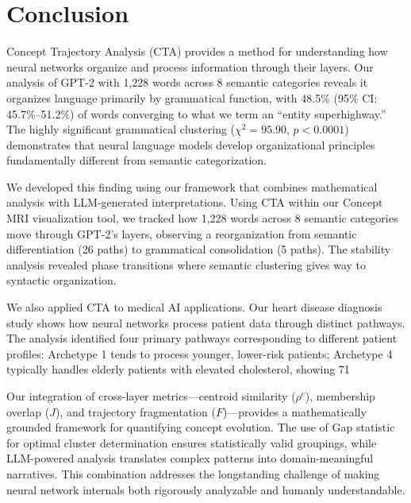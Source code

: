 \section{Conclusion}

Concept Trajectory Analysis (CTA) provides a method for understanding how neural networks organize and process information through their layers. Our analysis of GPT-2 with 1,228 words across 8 semantic categories reveals it organizes language primarily by grammatical function, with 48.5\% (95\% CI: 45.7\%–51.2\%) of words converging to what we term an ``entity superhighway.'' The highly significant grammatical clustering ($\chi^2 = 95.90$, $p < 0.0001$) demonstrates that neural language models develop organizational principles fundamentally different from semantic categorization.

We developed this finding using our framework that combines mathematical analysis with LLM-generated interpretations. Using CTA within our Concept MRI visualization tool, we tracked how 1,228 words across 8 semantic categories move through GPT-2's layers, observing a reorganization from semantic differentiation (26 paths) to grammatical consolidation (5 paths). The stability analysis revealed phase transitions where semantic clustering gives way to syntactic organization.

We also applied CTA to medical AI applications. Our heart disease diagnosis study shows how neural networks process patient data through distinct pathways. The analysis identified four primary pathways corresponding to different patient profiles: Archetype 1 tends to process younger, lower-risk patients; Archetype 4 typically handles elderly patients with elevated cholesterol, showing 71%

Our integration of cross-layer metrics—centroid similarity ($\rho^c$), membership overlap ($J$), and trajectory fragmentation ($F$)—provides a mathematically grounded framework for quantifying concept evolution. The use of Gap statistic for optimal cluster determination ensures statistically valid groupings, while LLM-powered analysis translates complex patterns into domain-meaningful narratives. This combination addresses the longstanding challenge of making neural network internals both rigorously analyzable and humanly understandable.

